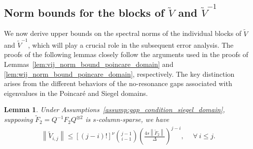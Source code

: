 \documentclass[superscriptaddress,onecolumn,nofootinbib,longbibliography,a4paper,accepted=2026-09-29]{quantumarticle}
\theoremstyle{plain}
\newtheorem{lemma}[thm]{Lemma}
\theoremstyle{definition}
\numberwithin{thm}{section}
\numberwithin{assumption}{section}
\numberwithin{lemma}{section}
\numberwithin{prop}{section}
\numberwithin{cor}{section}
\numberwithin{definition}{section}
\numberwithin{rmk}{section}
\numberwithin{equation}{section}
\newcommand{\norm}[1]     {\left\| #1 \right\|}
\newcommand{\lrb}[1]{\left ( #1 \right )}
\newcommand{\lrsb}[1]{\left [ #1 \right ]}
\begin{document}
\subsection{Norm bounds for the blocks of \texorpdfstring{$\tilde{V}$ and $\tilde{V}^{-1}$}{diagonalizing matrix and its inverse}}

We now derive upper bounds on the spectral norms of the individual blocks of $\tilde{V}$ and $\tilde{V}^{-1}$, which will play a crucial role in the subsequent error analysis. The proofs of the following lemmas closely follow the arguments used in the proofs of Lemmas~\ref{lem:vij_norm_bound_poincare_domain} and \ref{lem:wij_norm_bound_poincare_domain}, respectively. The key distinction arises from the different behaviors of the no-resonance gaps associated with eigenvalues in the Poincar\'{e} and Siegel domains.

\begin{lemma}
    Under Assumptions~\ref{assump:gap_condition_siegel_domain}, supposing $\tilde{F}_2 = Q^{-1}F_2 Q^{\otimes 2}$ is $s$-column-sparse, we have 
    \begin{align}
        \norm{\tilde{V}_{i,j}} \le \lrsb{(j-i)!}^\nu\binom{j-1}{i-1} \lrb{\frac{4s\norm{\tilde{F}_2}}{\Delta}}^{j-i},~&~\forall~i \le j.
    \end{align}
    \label{lem:vij_norm_bound_siegel_domain}
\end{lemma}
\end{document}
